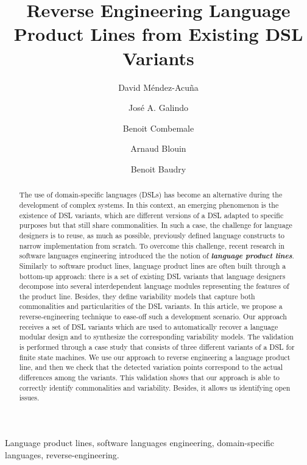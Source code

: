 \documentclass[preprint,5p]{elsarticle}
\begin{document}
\begin{frontmatter}

\title{Reverse Engineering Language Product Lines from Existing DSL Variants}

\author{David M\'endez-Acu\~na}

\author{Jos\'e A. Galindo}

\author{Benoit Combemale}

\author{Arnaud Blouin}

\author{Benoit Baudry}

\address{INRIA/IRISA and University of Rennes 1, France}

\begin{abstract}
The use of domain-specific languages (DSLs) has become an alternative during the development of complex systems. In this context, an emerging phenomenon is the existence of DSL variants, which are different versions of a DSL adapted to specific purposes but that still share commonalities. In such a case, the challenge for language designers is to reuse, as much as possible, previously defined language constructs to narrow implementation from scratch. To overcome this challenge, recent research in software languages engineering introduced the the notion of \textit{\textbf{language product lines}}. Similarly to software product lines, language product lines are often built through a bottom-up approach: there is a set of existing DSL variants that language designers decompose into several interdependent language modules representing the features of the product line. Besides, they define variability models that capture both commonalities and particularities of the DSL variants. In this article, we propose a reverse-engineering technique to ease-off such a development scenario. Our approach receives a set of DSL variants which are used to automatically recover a language modular design and to synthesize the corresponding variability models. The validation is performed through a case study that consists of three different variants of a DSL for finite state machines. We use our approach to reverse engineering a language product line, and then we check that the detected variation points correspond to the actual differences among the variants. This validation shows that our approach is able to correctly identify commonalities and variability. Besides, it allows us identifying open issues.

\end{abstract}

\begin{keyword}
Language product lines, software languages engineering, domain-specific languages, reverse-engineering.
\end{keyword}

\end{frontmatter}
\end{document}
